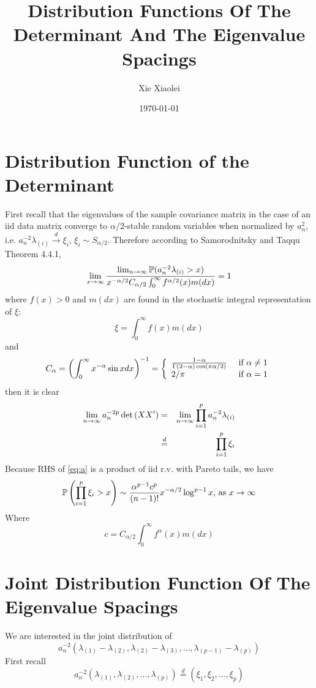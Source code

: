 \documentclass{article}
\title{Distribution Functions Of The Determinant And The Eigenvalue Spacings}
\author{Xie Xiaolei}
\date{\today}
\begin{document}
\maketitle
\section{Distribution Function of the Determinant}
First recall that the eigenvalues of the sample covariance matrix in
the case of an iid data matrix converge to $\alpha/2$-stable random
variables when normalized by $a_n^2$, i.e. $a_n^{-2} \lambda_{(i)}
\overset{d}{\to} \xi_{i}$, $\xi_{i} \sim S_{\alpha/2}$. Therefore
according to Samorodnitsky and Taqqu\cite{SamorodnitskyTaqqu1994}
Theorem 4.4.1,
\[
\lim_{x \to \infty} \frac{
  \lim_{n \to \infty} \P(a_n^{-2} \lambda_{(i)} > x)
}{
  x^{-\alpha/2} C_{\alpha/2} \int_{0}^{\infty} f^{\alpha/2}(x) m(dx)
} = 1
\]
where $f(x) > 0$ and $m(dx)$ are found in the stochastic integral
representation of $\xi$:
\[
\xi=\int_{0}^\infty f(x) m(dx)
\]
and
\[
C_\alpha = \left(
\int_0^\infty x^{-\alpha} \sin x dx
\right)^{-1} = \left\{
  \begin{array}{ll}
    {1 - \alpha \over \Gamma(2 - \alpha) \cos(\pi \alpha / 2)} & \text{ if } \alpha \neq 1
    \\
    2/\pi & \text{ if }\alpha = 1
  \end{array}
\right.
\]
then it is clear
\begin{eqnarray}
  \lim_{n \to \infty} a_n^{-2p} \det \mtx(XX') &=& \lim_{n \to \infty}
  \prod_{i=1}^p a_n^{-2} \lambda_{(i)} \nonumber \\
  &\overset{d}{=}& \prod_{i=1}^p \xi_{i} \label{eq:a}
\end{eqnarray}
Because RHS of \eqref{eq:a} is a product of iid r.v. with Pareto
tails, we have
\[
\P\left(
\prod_{i=1}^p \xi_{i} > x
\right) \sim {\alpha^{p-1} c^p \over (n-1)!}  x^{-\alpha/2} \log^{p-1} x 
\text{, as } x \to \infty
\]
Where
\[
c =  C_{\alpha/2} \int_{0}^{\infty} f^\alpha(x) m(dx)
\]

\section{Joint Distribution Function Of The Eigenvalue Spacings}
We are interested in the joint distribution of
\[
a_n^{-2}(\lambda_{(1)} - \lambda_{(2)}, \lambda_{(2)} - \lambda_{(3)},
\dots, \lambda_{(p-1)} - \lambda_{(p)})
\]
First recall
\[
a_n^{-2}(\lambda_{(1)}, \lambda_{(2)}, \dots, \lambda_{(p)})
\overset{d}{=} (\xi_1, \xi_2, \dots, \xi_p)
\]
\end{document}
